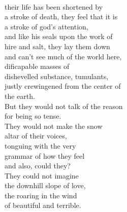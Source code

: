 \documentclass[smalldemyvopaper,11pt,twoside,onecolumn,openright,extrafontsizes]{memoir}
\begin{document}
\\their life has been shortened by
\\a stroke of death, they feel that it is
\\a stroke of god's attention,
\\and like his seals upon the work of
\\hire and salt, they lay them down
\\and can't see much of the world here,
\\dificapable masses of
\\dishevelled substance, tumulants,
\\justly crewingened from the center of
\\the earth.
\\But they would not talk of the reason
\\for being so tense.
\\They would not make the snow
\\altar of their voices,
\\tonguing with the very
\\grammar of how they feel
\\and also, could they?
\\They could not imagine
\\the downhill slope of love,
\\the roaring in the wind
\\of beautiful and terrible.
\end{document}

